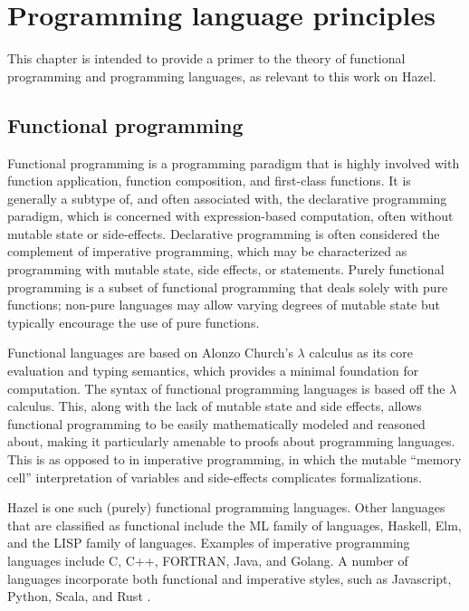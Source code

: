 \section{Programming language principles}
\label{sec:prog_lang_principles}

This chapter is intended to provide a primer to the theory of functional programming and programming languages, as relevant to this work on Hazel.

\subsection{Functional programming}
\label{sec:fp}

Functional programming  is a programming paradigm that is highly involved with function application, function composition, and first-class functions. It is generally a subtype of, and often associated with, the declarative programming paradigm, which is concerned with expression-based computation, often without mutable state or side-effects. Declarative programming is often considered the complement of imperative programming, which may be characterized as programming with mutable state, side effects, or statements. Purely functional programming is a subset of functional programming that deals solely with pure functions; non-pure languages may allow varying degrees of mutable state but typically encourage the use of pure functions.

Functional languages are based on Alonzo Church's $\lambda$ calculus  as its core evaluation and typing semantics, which provides a minimal foundation for computation. The syntax of functional programming languages is based off the $\lambda$ calculus. This, along with the lack of mutable state and side effects, allows functional programming to be easily mathematically modeled and reasoned about, making it particularly amenable to proofs about programming languages. This is as opposed to in imperative programming, in which the mutable ``memory cell'' interpretation of variables and side-effects complicates formalizations.

Hazel is one such (purely) functional programming languages. Other languages that are classified as functional include the ML family of languages, Haskell, Elm, and the LISP family of languages. Examples of imperative programming languages include C, C++, FORTRAN, Java, and Golang. A number of languages incorporate both functional and imperative styles, such as Javascript, Python, Scala, and Rust .

